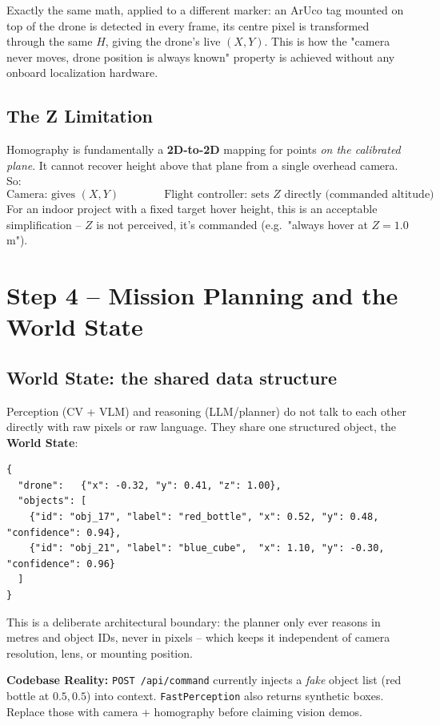 \documentclass[11pt,a4paper]{article}
\begin{document}
Exactly the same math, applied to a different marker: an ArUco tag mounted on top of the drone is
detected in every frame, its centre pixel is transformed through the same $H$, giving the drone's
live $(X,Y)$. This is how the "camera never moves, drone position is always known" property is
achieved without any onboard localization hardware.

\subsection{The Z Limitation}

Homography is fundamentally a \textbf{2D-to-2D} mapping for points \emph{on the calibrated
plane}. It cannot recover height above that plane from a single overhead camera. So:
\[
\text{Camera: gives } (X, Y) \qquad \qquad \text{Flight controller: sets } Z \text{ directly (commanded altitude)}
\]
For an indoor project with a fixed target hover height, this is an acceptable simplification --
$Z$ is not perceived, it's commanded (e.g.\ "always hover at $Z=1.0$m").

\section{Step 4 -- Mission Planning and the World State}

\subsection{World State: the shared data structure}

Perception (CV + VLM) and reasoning (LLM/planner) do not talk to each other directly with raw
pixels or raw language. They share one structured object, the \textbf{World State}:

\begin{verbatim}
{
  "drone":   {"x": -0.32, "y": 0.41, "z": 1.00},
  "objects": [
    {"id": "obj_17", "label": "red_bottle", "x": 0.52, "y": 0.48, "confidence": 0.94},
    {"id": "obj_21", "label": "blue_cube",  "x": 1.10, "y": -0.30, "confidence": 0.96}
  ]
}
\end{verbatim}

This is a deliberate architectural boundary: the planner only ever reasons in metres and object
IDs, never in pixels -- which keeps it independent of camera resolution, lens, or mounting
position.

\begin{quotebox}
\textbf{Codebase Reality:} \texttt{POST /api/command} currently injects a \emph{fake} object list
(red bottle at $0.5,0.5$) into context. \texttt{FastPerception} also returns synthetic boxes.
Replace those with camera + homography before claiming vision demos.
\end{quotebox}
\end{document}

